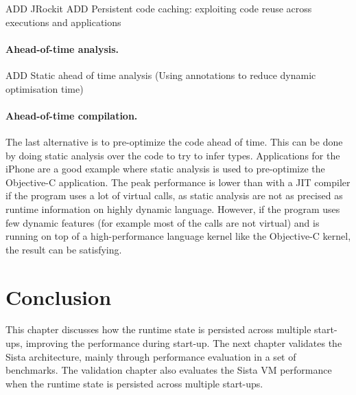 \documentclass[a4paper,12pt,twoside]{../includes/ThesisStyle}
\begin{document}
ADD 
JRockit\cite{JRockit}
ADD
Persistent code caching: exploiting code reuse across executions and applications
\cite{Redd07a}

\paragraph{Ahead-of-time analysis.}

ADD
Static ahead of time analysis (Using annotations to reduce dynamic optimisation time) \cite{Krin01a}

\paragraph{Ahead-of-time compilation.}

The last alternative is to pre-optimize the code ahead of time. This can be done by doing static analysis over the code to try to infer types. Applications for the iPhone are a good example where static analysis is used to pre-optimize the Objective-C application. The peak performance is lower than with a JIT compiler if the program uses a lot of virtual calls, as static analysis are not as precised as runtime information on highly dynamic language. 
However, if the program uses few dynamic features (for example most of the calls are not virtual) and is running on top of a high-performance language kernel like the Objective-C kernel, the result can be satisfying.


\section*{Conclusion} This chapter discusses how the runtime state is persisted across multiple start-ups, improving the performance during start-up. The next chapter validates the Sista architecture, mainly through performance evaluation in a set of benchmarks. The validation chapter also evaluates the Sista VM performance when the runtime state is persisted across multiple start-ups.

\ifx\wholebook\relax\else
    
\end{document}
